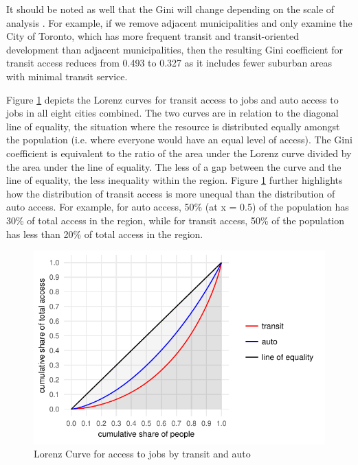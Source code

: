 \documentclass[11 pt, letterpaper]{article}
\begin{document}
{It should be noted as well that the Gini will change depending on the scale of analysis \cite{bertolaccini2013}. For example, if we remove adjacent municipalities and only examine the City of Toronto, which has more frequent transit and transit-oriented development than adjacent municipalities, then the resulting Gini coefficient for transit access reduces from 0.493 to 0.327 as it includes fewer suburban areas with minimal transit service.

Figure \ref{lorenz} depicts the Lorenz curves for transit access to jobs and auto access to jobs in all eight cities combined. The two curves are in relation to the diagonal line of equality, the situation where the resource is distributed equally amongst the population (i.e. where everyone would have an equal level of access). The Gini coefficient is equivalent to the ratio of the area under the Lorenz curve divided by the area under the line of equality. The less of a gap between the curve and the line of equality, the less inequality within the region. Figure \ref{lorenz} further highlights how the distribution of transit access is more unequal than the distribution of auto access. For example, for auto access, 50\% (at x = 0.5) of the population has 30\% of total access in the region, while for transit access, 50\% of the population has less than 20\% of total access in the region.

\begin{figure}[H]
	\vspace{2mm}
	\caption{Lorenz Curve for access to jobs by transit and auto} 
	\label{lorenz}
	\centerline{\includegraphics[width=4.5in]{figures/summary_plots/lorenz_all.pdf}}
	\vspace{2mm}
\end{figure}



}
\end{document}
